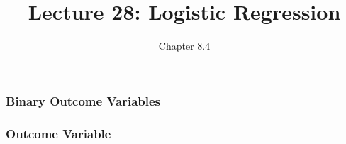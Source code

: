 \documentclass[handout]{beamer}
\title{Lecture 28: Logistic Regression}
\author{Chapter 8.4}
\date{}
\newcommand{\blue}[1]{\textcolor{blue2}{#1}}
\begin{document}
\begin{frame}
\titlepage
\end{frame}


%
%
%
%
%
%
%


\begin{frame}[fragile]
\frametitle{Binary Outcome Variables}

%
%
%

\end{frame}


\begin{frame}[fragile]
\frametitle{Outcome Variable}

%
%
%
%
%

\end{frame}
\end{document}
